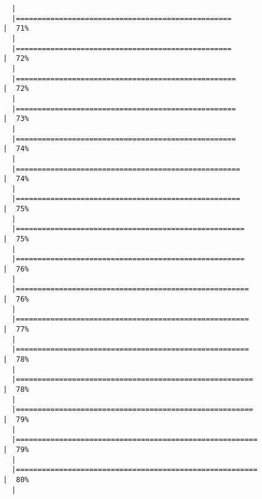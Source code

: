 \documentclass[
  letterpaper,
]{book}
\begin{document}
\begin{verbatim}
  |                                                                            
  |==================================================                    |  71%
  |                                                                            
  |==================================================                    |  72%
  |                                                                            
  |===================================================                   |  72%
  |                                                                            
  |===================================================                   |  73%
  |                                                                            
  |===================================================                   |  74%
  |                                                                            
  |====================================================                  |  74%
  |                                                                            
  |====================================================                  |  75%
  |                                                                            
  |=====================================================                 |  75%
  |                                                                            
  |=====================================================                 |  76%
  |                                                                            
  |======================================================                |  76%
  |                                                                            
  |======================================================                |  77%
  |                                                                            
  |======================================================                |  78%
  |                                                                            
  |=======================================================               |  78%
  |                                                                            
  |=======================================================               |  79%
  |                                                                            
  |========================================================              |  79%
  |                                                                            
  |========================================================              |  80%
  |                                                                            

\end{verbatim}
\end{document}
